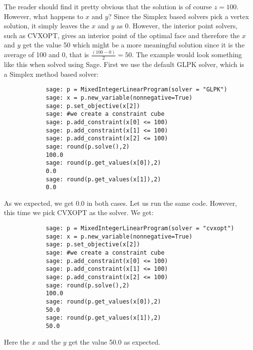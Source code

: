 The reader should find it pretty obvious that the solution is of course $z=100$. However, what happens to $x$ and $y$? 
Since the Simplex based solvers pick a vertex solution, it simply leaves the $x$ and $y$ as 0. However, the interior point solvers, such as CVXOPT, gives an interior point of the optimal face and therefore the $x$ and $y$ get the value 50 which might be a more meaningful solution since it is the average of 100 and 0, that is  $\frac{(100-0)}{2}=50$. The example would look something like this when solved using Sage. First we use the default GLPK solver, which is a Simplex method based solver:

\begin{verbatim}
            sage: p = MixedIntegerLinearProgram(solver = "GLPK")
            sage: x = p.new_variable(nonnegative=True)
            sage: p.set_objective(x[2])
            sage: #we create a constraint cube
            sage: p.add_constraint(x[0] <= 100)
            sage: p.add_constraint(x[1] <= 100)
            sage: p.add_constraint(x[2] <= 100)
            sage: round(p.solve(),2)
            100.0
            sage: round(p.get_values(x[0]),2)
            0.0
            sage: round(p.get_values(x[1]),2)
            0.0
\end{verbatim} 

As we expected, we get  0.0 in both cases. Let us run the same code. However, this time we pick CVXOPT as the solver. We get:

\begin{verbatim}
            sage: p = MixedIntegerLinearProgram(solver = "cvxopt")
            sage: x = p.new_variable(nonnegative=True)
            sage: p.set_objective(x[2])
            sage: #we create a constraint cube
            sage: p.add_constraint(x[0] <= 100)
            sage: p.add_constraint(x[1] <= 100)
            sage: p.add_constraint(x[2] <= 100)
            sage: round(p.solve(),2)
            100.0
            sage: round(p.get_values(x[0]),2)
            50.0
            sage: round(p.get_values(x[1]),2)
            50.0
\end{verbatim}

Here the $x$ and the $y$ get the value 50.0 as expected. 



























